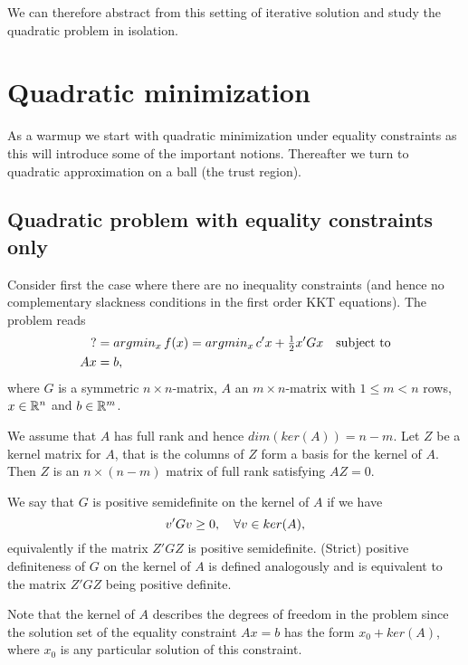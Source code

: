 We can therefore abstract from this setting of iterative solution and study the quadratic 
problem in isolation.


\section{Quadratic minimization}
\label{sec:QP}

As a warmup we start with quadratic minimization under equality constraints as this will 
introduce some of the important notions. Thereafter we turn to quadratic approximation on 
a ball (the trust region).


\subsection{Quadratic problem with equality constraints only}
\label{subsec:QP_with_eqs}

Consider first the case where there are no inequality constraints (and hence no
complementary slackness conditions in the first order KKT equations). The problem reads
%
\begin{align}
\label{qp}
? &= argmin_x\thinspace f(x) = argmin_x\thinspace c'x+\tfrac{1}{2}x'Gx\quad\text{subject to}
\\\label{lc}
Ax &= b,  
\end{align}
%
where $G$ is a symmetric $n\times n$-matrix, $A$ an $m\times n$-matrix with 
$1\leq m<n$ rows, $x\in{\mathbb R}^n$ and $b\in{\mathbb R}^m$.

We assume that $A$ has full rank and hence $dim(ker(A))=n-m$. Let $Z$ be a 
kernel matrix for $A$, that is the columns of $Z$ form a basis for the kernel 
of $A$. Then $Z$ is an $n\times(n-m)$ matrix of full rank satisfying $AZ=0$.

We say that $G$ is positive semidefinite on the kernel of $A$ if we have
%
\begin{equation}
\label{psd_on_kerA}
v'Gv\geq 0,\quad\forall v\in ker(A),
\end{equation}  
%
equivalently if the matrix $Z'GZ$ is positive semidefinite. (Strict) positive 
definiteness of $G$ on the kernel of $A$ is defined analogously and is 
equivalent to the matrix $Z'GZ$ being positive definite.

Note that the kernel of $A$ describes the degrees of freedom in the problem  
since the solution set of the equality constraint $Ax=b$ has the form 
$x_0+ker(A)$, where $x_0$ is any particular solution of this constraint.

